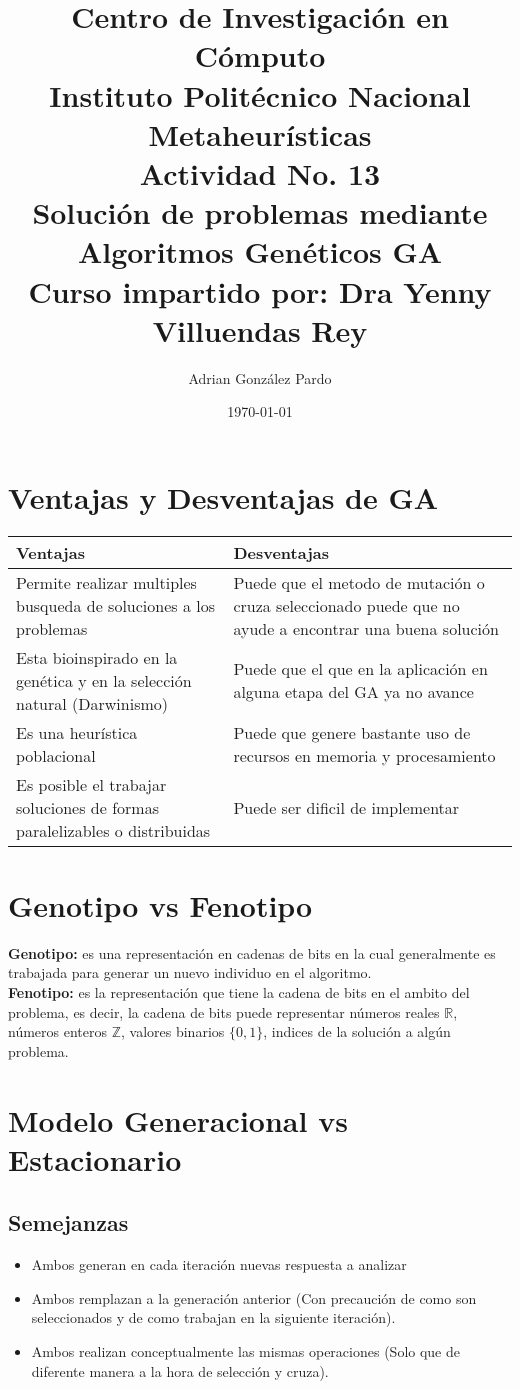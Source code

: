 \documentclass[10pt]{article}
\title{Centro de Investigación en Cómputo\\Instituto Politécnico Nacional\\Metaheurísticas\\Actividad No. 13\\ Solución de problemas mediante Algoritmos Genéticos GA\\Curso impartido por: Dra Yenny Villuendas Rey}
\author{Adrian González Pardo}
\date{\today}
\begin{document}
\maketitle
\section{Ventajas y Desventajas de GA}
\begin{center}
  \begin{tabular}{|p{6cm}|p{6cm}|}
    \hline
    Ventajas & Desventajas \\
    \hline
    Permite realizar multiples busqueda de soluciones a los problemas & Puede que el metodo de mutación o cruza seleccionado puede que no ayude a encontrar una buena solución\\
    \hline
    Esta bioinspirado en la genética y en la selección natural (Darwinismo) & Puede que el que en la aplicación en alguna etapa del GA ya no avance \\
    \hline
    Es una heurística poblacional & Puede que genere bastante uso de recursos en memoria y procesamiento \\
    \hline
    Es posible el trabajar soluciones de formas paralelizables o distribuidas&Puede ser dificil de implementar\\
    \hline
  \end{tabular}
\end{center}
\section{Genotipo vs Fenotipo}
\textbf{Genotipo:} es una representación en cadenas de bits en la cual generalmente es trabajada para generar un nuevo individuo en el algoritmo.
\\
\textbf{Fenotipo:} es la representación que tiene la cadena de bits en el ambito del problema, es decir, la cadena de bits puede representar números reales $\mathbb{R}$, números enteros $\mathbb{Z}$, valores binarios $\{0,1\}$, indices de la solución a algún problema.
\section{Modelo Generacional vs Estacionario}
\subsection{Semejanzas}
\begin{itemize}
  \item Ambos generan en cada iteración nuevas respuesta a analizar
  \item Ambos remplazan a la generación anterior (Con precaución de como son seleccionados y de como trabajan en la siguiente iteración).
  \item Ambos realizan conceptualmente las mismas operaciones (Solo que de diferente manera a la hora de selección y cruza).
\end{itemize}
\end{document}
